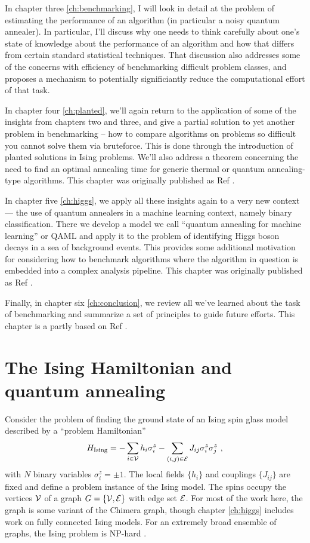 In chapter three \ref{ch:benchmarking}, I will look in detail at the problem of estimating the performance of an algorithm (in particular a noisy quantum annealer). In particular, I'll discuss why one needs to think carefully about one's state of knowledge about the performance of an algorithm and how that differs from certain standard statistical techniques. That discussion also addresses some of the concerns with efficiency of benchmarking difficult problem classes, and proposes a mechanism to potentially significiantly reduce the computational effort of that task.

In chapter four \ref{ch:planted}, we'll again return to the application of some of the insights from chapters two and three, and give a partial solution to yet another problem in benchmarking -- how to compare algorithms on problems so difficult you cannot solve them via bruteforce. This is done through the introduction of planted solutions in Ising problems. We'll also address a theorem concerning the need to find an optimal annealing time for generic thermal or quantum annealing-type algorithms. This chapter was originally published as Ref \cite{Hen:2015rt}.

In chapter five \ref{ch:higgs}, we apply all these insights again to a very new context --- the use of quantum annealers in a machine learning context, namely binary classification. There we develop a model we call ``quantum annealing for machine learning'' or QAML and apply it to the problem of identifying Higgs boson decays in a sea of background events. This provides some additional motivation for considering how to benchmark algorithms where the algorithm in question is embedded into a complex analysis pipeline. This chapter was originally published as Ref \cite{myhiggs}.

Finally, in chapter six \ref{ch:conclusion}, we review all we've learned about the task of benchmarking and summarize a set of principles to guide future efforts. This chapter is a partly based on Ref \cite{job2018test}.

\section{The Ising Hamiltonian and quantum annealing}
\label{app:algorithms}
Consider the problem of finding the ground state of an Ising spin glass model described by a  ``problem Hamiltonian''
\begin{equation}
H_{\mathrm{Ising}} = -\sum_{i\in \mathcal{V}} h_i \sigma_i^z - \sum_{(i,j)\in \mathcal{E}} J_{ij} \sigma_i^z \sigma_j^z \ ,
\label{eq:H}
\end{equation}
with $N$ binary variables $\sigma_i^z = \pm 1$. The local fields $\{h_i\}$ and couplings $\{J_{ij}\}$ are fixed and define a {problem instance} of the Ising model.
 The spins occupy the vertices $\mathcal{V}$ of a graph $G=\{\mathcal{V},\mathcal{E}\}$ with edge set $\mathcal{E}$. For most of the work here, the graph is some variant of the Chimera graph, though chapter \ref{ch:higgs} includes work on fully connected Ising models. For an extremely broad ensemble of graphs, the Ising problem is NP-hard \cite{Barahona1982}.

